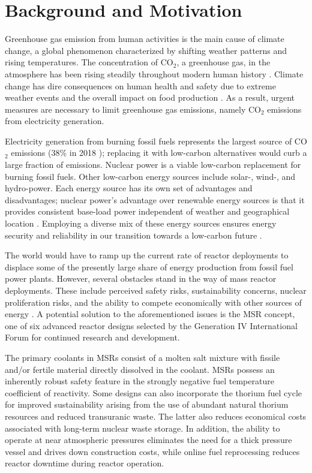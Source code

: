 \section{Background and Motivation}

Greenhouse gas emission from human activities is the main cause of climate
change, a global phenomenon characterized by shifting weather patterns and
rising temperatures. The concentration of CO$_2$, a greenhouse gas, in the
atmosphere has been rising steadily throughout modern human history
\cite{us_department_of_commerce_global_nodate}. Climate change has dire
consequences on human health and safety due to extreme weather events and the
overall impact on food production \cite{noauthor_global_nodate}. As a result,
urgent measures are necessary to limit greenhouse gas emissions, namely CO$_2$
emissions from electricity generation.

Electricity generation from burning fossil fuels represents the
largest source of CO$_2$ emissions (38\% in 2018 \cite{iea_global_2019});
replacing it with low-carbon
alternatives would curb a large fraction of emissions. Nuclear power is
a viable low-carbon replacement for burning fossil fuels.
Other low-carbon energy sources include solar-, wind-, and hydro-power. Each
energy source has its own set of advantages and disadvantages; nuclear power's
advantage over renewable energy sources is that it provides consistent
base-load power independent of weather and geographical location
\cite{petti_future_2018}. Employing a diverse mix of these energy sources
ensures energy security and reliability in our transition
towards a low-carbon future \cite{petti_future_2018}.

The world would have to ramp up the current rate of reactor deployments to
displace some of the
presently large share of energy production from fossil fuel power plants.
However, several obstacles stand in the way of mass reactor deployments. These
include perceived safety risks, sustainability concerns, nuclear proliferation
risks, and the ability to compete economically with other sources of energy
\cite{massachusetts_institute_of_technology_future_2003}. A potential solution
to the aforementioned issues is the \gls{MSR} concept, one of six advanced
reactor designs selected by the Generation IV International Forum
\cite{gif_technology_2002} for continued research and development.

The primary coolants in MSRs consist of a molten salt mixture
with fissile and/or fertile material directly dissolved in the coolant.
MSRs possess an inherently robust safety feature in the strongly negative fuel
temperature coefficient of reactivity. Some designs can also incorporate the
thorium fuel cycle for improved sustainability arising from the use of
abundant natural thorium resources and reduced transuranic waste. The
latter also reduces economical costs
associated with long-term nuclear waste storage. In addition, the ability to
operate at near atmospheric pressures eliminates the need for a thick pressure
vessel and drives down construction costs, while online fuel reprocessing
reduces reactor downtime during reactor operation.

